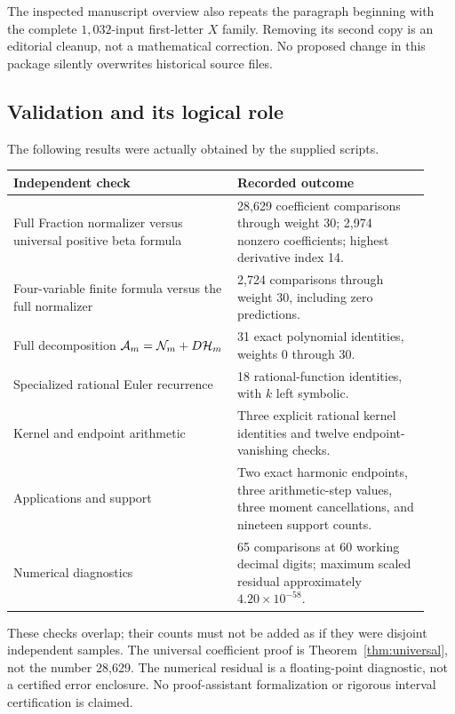 The inspected manuscript overview also repeats the paragraph beginning with the complete $1{,}032$-input first-letter $X$ family. Removing its second copy is an editorial cleanup, not a mathematical correction. No proposed change in this package silently overwrites historical source files.

\subsection{Validation and its logical role}

The following results were actually obtained by the supplied scripts.

\begin{center}
\small
\begin{tabular}{@{}p{0.50\linewidth}p{0.43\linewidth}@{}}
\toprule
Independent check & Recorded outcome\\
\midrule
Full Fraction normalizer versus universal positive beta formula & 28,629 coefficient comparisons through weight 30; 2,974 nonzero coefficients; highest derivative index 14.\\[4pt]
Four-variable finite formula versus the full normalizer & 2,724 comparisons through weight 30, including zero predictions.\\[4pt]
Full decomposition $\mathcal A_m=\mathcal N_m+D\mathcal H_m$ & 31 exact polynomial identities, weights 0 through 30.\\[4pt]
Specialized rational Euler recurrence & 18 rational-function identities, with $k$ left symbolic.\\[4pt]
Kernel and endpoint arithmetic & Three explicit rational kernel identities and twelve endpoint-vanishing checks.\\[4pt]
Applications and support & Two exact harmonic endpoints, three arithmetic-step values, three moment cancellations, and nineteen support counts.\\[4pt]
Numerical diagnostics & 65 comparisons at 60 working decimal digits; maximum scaled residual approximately $4.20\times10^{-58}$.\\
\bottomrule
\end{tabular}
\end{center}

These checks overlap; their counts must not be added as if they were disjoint independent samples. The universal coefficient proof is Theorem~\ref{thm:universal}, not the number 28,629. The numerical residual is a floating-point diagnostic, not a certified error enclosure. No proof-assistant formalization or rigorous interval certification is claimed.

